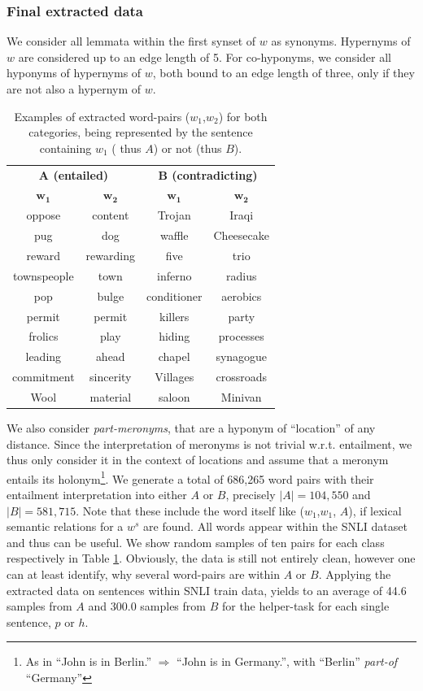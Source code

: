 \subsubsection{Final extracted data}
We consider all lemmata within the first synset of $w$ as synonyms. Hypernyms of $w$ are considered up to an edge length of 5. For co-hyponyms, we consider all hyponyms of hypernyms of $w$, both bound to an edge length of three, only if they are not also a hypernym of $w$. 
\begin{table}[tph!]
\centering
\begin{tabular}{cc|cc}
\multicolumn{2}{c}{\textbf{$\mathbf{A}$ (entailed)}} & \multicolumn{2}{c}{\textbf{$\mathbf{B}$ (contradicting)}} \\
\textbf{$\mathbf{w_1}$} & \textbf{$\mathbf{w_2}$} & \textbf{$\mathbf{w_1}$} & \textbf{$\mathbf{w_2}$} \\
\toprule
oppose & content & Trojan & Iraqi\\
pug & dog & waffle & Cheesecake\\
reward & rewarding & five & trio \\
townspeople & town & inferno & radius \\
pop & bulge & conditioner & aerobics\\
permit & permit & killers & party\\
frolics & play & hiding & processes\\
leading & ahead & chapel & synagogue\\
commitment & sincerity & Villages & crossroads\\
Wool & material & saloon & Minivan\\
\bottomrule
\end{tabular}
\caption{Examples of extracted word-pairs ($w_1$,$w_2$) for both categories, being represented by the sentence containing $w_1$ ( thus $A$) or not (thus $B$).}
\label{tab:examples_extracted_wn}
\end{table}
We also consider \textit{part-meronyms}, that are a hyponym of ``location'' of any distance. Since the interpretation of meronyms is not trivial w.r.t. entailment, we thus only consider it in the context of locations and assume that a meronym entails its holonym\footnote{As in ``John is in Berlin.'' $\Rightarrow$ ``John is in Germany.'', with ``Berlin'' \textit{part-of} ``Germany''}. We generate a total of 686,265 word pairs with their entailment interpretation into either $A$ or $B$, precisely $|A|=104,550$ and $|B|=581,715$. Note that these include the word itself like ($w_1$,$w_1$, $A$), if lexical semantic relations for a $w^s$ are found. All words appear within the \ac{SNLI} dataset and thus can be useful. We show random samples of ten pairs for each class respectively in Table \ref{tab:examples_extracted_wn}.
Obviously, the data is still not entirely clean, however one can at least identify, why several word-pairs are within $A$ or $B$. Applying the extracted data on sentences within \ac{SNLI} train data, yields to an average of 44.6 samples from $A$ and 300.0 samples from $B$ for the helper-task for each single sentence, $p$ or $h$.
